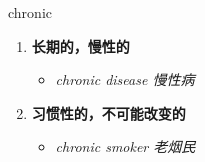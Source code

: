 
\begin{frame}
{\huge chronic}
\begin{center}
\begin{enumerate}\Large
  \item \textbf{长期的，慢性的}
  \begin{itemize}
    \item \em{\Large{chronic disease 慢性病}}
  \end{itemize}
  \item \textbf{习惯性的，不可能改变的}
  \begin{itemize}
    \item \em{\Large{chronic smoker 老烟民}}
  \end{itemize}
\end{enumerate}
\end{center}
\end{frame}
